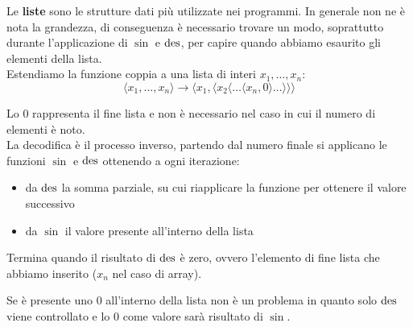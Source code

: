 Le \textbf{liste} sono le strutture dati più utilizzate nei programmi. In generale non ne è nota la grandezza, di conseguenza è necessario trovare un modo, soprattutto durante l'applicazione di $\sin$ e $\operatorname{des}$, per capire quando abbiamo esaurito gli elementi della lista.\\

Estendiamo la funzione coppia a una lista di interi $x_1, \dots, x_n$:
$$ \langle x_1, \dots, x_n \rangle \rightarrow \langle x_1, \langle x_2 \langle \dots \langle x_n, 0 \rangle \dots \rangle \rangle \rangle $$

Lo $0$ rappresenta il fine lista e non è necessario nel caso in cui il numero di elementi è noto.\\

La decodifica è il processo inverso, partendo dal numero finale si applicano le funzioni $\sin$ e $\operatorname{des}$ ottenendo a ogni iterazione: 
\begin{itemize}
	\item da $\operatorname{des}$ la somma parziale, su cui riapplicare la funzione per ottenere il valore successivo
	\item da $\sin$ il valore presente all'interno della lista
\end{itemize} 
Termina quando il risultato di $\operatorname{des}$ è zero, ovvero l'elemento di fine lista che abbiamo inserito ($x_n$ nel caso di array).
\begin{center}
\end{center}
Se è presente uno 0 all'interno della lista non è un problema in quanto solo $\operatorname{des}$ viene controllato e lo 0 come valore sarà risultato di $\sin$.\\

